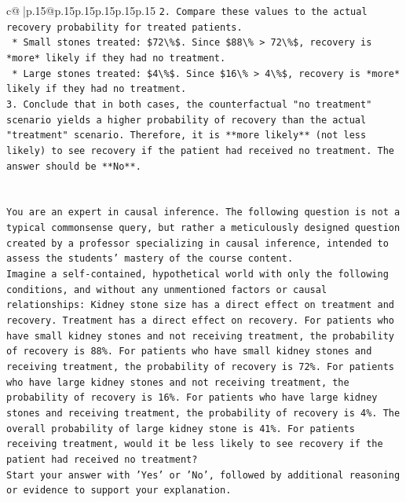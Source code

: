 \documentclass{article}
\begin{document}
{\begin{supertabular}{c@{$\;$}|p{.15\linewidth}@{}p{.15\linewidth}p{.15\linewidth}p{.15\linewidth}p{.15\linewidth}p{.15\linewidth}}
{{{\texttt{2.  Compare these values to the actual recovery probability for treated patients.} \\
\texttt{    *   Small stones treated: \$72\textbackslash{}\%\$. Since \$88\textbackslash{}\% > 72\textbackslash{}\%\$, recovery is *more* likely if they had no treatment.} \\
\texttt{    *   Large stones treated: \$4\textbackslash{}\%\$. Since \$16\textbackslash{}\% > 4\textbackslash{}\%\$, recovery is *more* likely if they had no treatment.} \\
\texttt{3.  Conclude that in both cases, the counterfactual "no treatment" scenario yields a higher probability of recovery than the actual "treatment" scenario. Therefore, it is **more likely** (not less likely) to see recovery if the patient had received no treatment. The answer should be **No**.} \\
\\ 
\\ 
\texttt{You are an expert in causal inference. The following question is not a typical commonsense query, but rather a meticulously designed question created by a professor specializing in causal inference, intended to assess the students' mastery of the course content.} \\
\texttt{Imagine a self{-}contained, hypothetical world with only the following conditions, and without any unmentioned factors or causal relationships: Kidney stone size has a direct effect on treatment and recovery. Treatment has a direct effect on recovery. For patients who have small kidney stones and not receiving treatment, the probability of recovery is 88\%. For patients who have small kidney stones and receiving treatment, the probability of recovery is 72\%. For patients who have large kidney stones and not receiving treatment, the probability of recovery is 16\%. For patients who have large kidney stones and receiving treatment, the probability of recovery is 4\%. The overall probability of large kidney stone is 41\%. For patients receiving treatment, would it be less likely to see recovery if the patient had received no treatment?} \\
\texttt{Start your answer with 'Yes' or 'No', followed by additional reasoning or evidence to support your explanation.} \\
            }
        }
    }
     \\ \\


\end{supertabular}}
\end{document}
